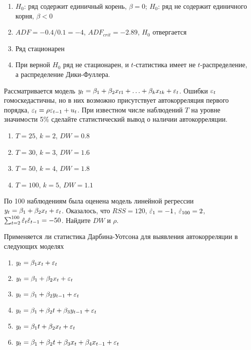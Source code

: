 \documentclass[pdftex,11pt,openany]{book}\usepackage[]{graphicx}\usepackage[]{color}
\begin{document}
\begin{solution}




\begin{enumerate}
\item $H_0$: ряд содержит единичный корень, $\beta=0$; $H_0$: ряд не содержит единичного корня, $\beta<0$
\item $ADF=-0.4/0.1=-4$, $ADF_{crit}=-2.89$, $H_0$ отвергается
\item Ряд стационарен
\item При верной $H_0$ ряд не стационарен, и  $t$-статистика имеет не $t$-распределение, а распределение Дики-Фуллера.
\end{enumerate}
\end{solution}



\begin{problem}
Рассматривается модель $y_t=\beta_1+\beta_2 x_{t1}+\ldots+\beta_k x_{tk}+\varepsilon_t$. Ошибки $\varepsilon_t$ гомоскедастичны, но в них возможно присутствует автокорреляция первого порядка, $\varepsilon_t=\rho \varepsilon_{t-1}+u_t$. При известном числе наблюдений $T$ на уровне значимости 5\% сделайте статистический вывод о наличии автокорреляции.
\begin{enumerate}
\item $T=25$, $k=2$, $DW=0.8$
\item $T=30$, $k=3$, $DW=1.6$
\item $T=50$, $k=4$, $DW=1.8$
\item $T=100$, $k=5$, $DW=1.1$
\end{enumerate}
\end{problem}

\begin{solution}
\end{solution}


\begin{problem}
По 100 наблюдениям была оценена модель линейной регрессии
$y_t=\beta_1+\beta_2 x_t+\varepsilon_t$. Оказалось, что $RSS=120$, $\hat{\varepsilon}_1=-1$, $\hat{\varepsilon}_{100}=2$, $\sum_{t=2}^{100} \hat{\varepsilon}_t\hat{\varepsilon}_{t-1}=-50$. Найдите $DW$ и $\rho$.
\end{problem}

\begin{solution}
\end{solution}


\begin{problem}
Применяется ли статистика Дарбина-Уотсона для выявления автокорреляции в следующих моделях
\begin{enumerate}
\item $y_t=\beta_1 x_t + \varepsilon_t$
\item $y_t=\beta_1 + \beta_2 x_t + \varepsilon_t$
\item $y_t=\beta_1 + \beta_2 y_{t-1} + \varepsilon_t$
\item $y_t=\beta_1 + \beta_2 t +\beta_3 y_{t-1} + \varepsilon_t$
\item $y_t=\beta_1 t + \beta_2 x_t + \varepsilon_t$
\item $y_t=\beta_1 + \beta_2 t +\beta_3 x_t +\beta_4 x_{t-1} + \varepsilon_t$
\end{enumerate}
\end{problem}
\end{document}

